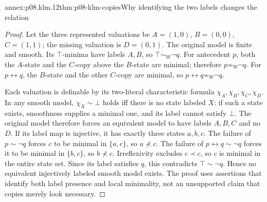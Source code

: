 \begin{annexitem}{annex:p08.klm.12}{thm:p08-klm-copies}{Why identifying the two labels changes the relation}
\begin{proof}
Let the three represented valuations be \(A=(1,0)\), \(B=(0,0)\),
\(C=(1,1)\); the missing valuation is \(D=(0,1)\).
The original model is finite and smooth. Its \(\top\)-minima have
labels \(A,B\), so \(\top\sim_W\neg q\).
For antecedent \(p\), both the \(A\)-state and the \(C\)-copy
above the \(B\)-state are minimal; therefore \(p\not\sim_W\neg q\).
For \(p\leftrightarrow q\), the \(B\)-state and the other
\(C\)-copy are minimal, so
\(p\leftrightarrow q\not\sim_W\neg q\).

Each valuation is definable by its two-literal characteristic formula
\(\chi_A,\chi_B,\chi_C,\chi_D\). In any smooth model,
\(\chi_X\sim\bot\) holds iff there is no state labeled \(X\):
if such a state exists, smoothness supplies a minimal one, and its
label cannot satisfy \(\bot\). The original model therefore forces
an equivalent model to have labels \(A,B,C\) and no \(D\).
If its label map is injective, it has exactly three states \(a,b,c\).
The failure of \(p\sim\neg q\) forces \(c\) to be minimal
in \(\{a,c\}\), so \(a\not\prec c\).
The failure of \(p\leftrightarrow q\sim\neg q\) forces it to
be minimal in \(\{b,c\}\), so \(b\not\prec c\).
Irreflexivity excludes \(c\prec c\), so \(c\) is minimal in
the entire state set. Since its label satisfies \(q\), this contradicts
\(\top\sim\neg q\). Hence no equivalent injectively labeled
smooth model exists. The proof uses assertions that identify both
label presence and local minimality, not an unsupported claim that
copies merely look necessary.
\end{proof}
\end{annexitem}

